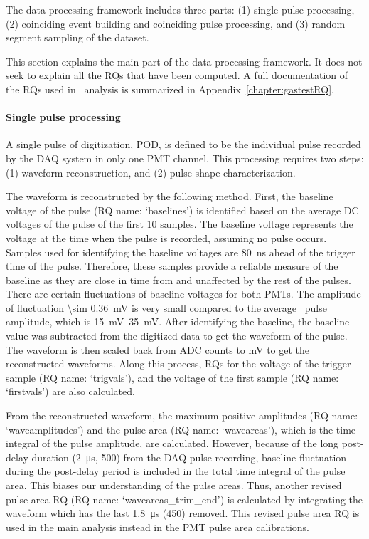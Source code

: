 The data processing framework includes three parts: (1) single pulse processing, (2) coinciding event building and coinciding pulse processing, and (3) random segment sampling of the dataset.

This section explains the main part of the data processing framework. It does not seek to explain all the RQs that have been computed. A full documentation of the RQs used in \gtest\ analysis is summarized in Appendix~\ref{chapter:gastestRQ}.

\paragraph{Single pulse processing} A single pulse of digitization, POD, is defined to be the individual pulse recorded by the DAQ system in only one PMT channel. This processing requires two steps: (1) waveform reconstruction, and (2) pulse shape characterization. 

The waveform is reconstructed by the following method. First, the baseline voltage of the pulse (RQ name: `baselines') is identified based on the average DC voltages of the pulse of the first 10 samples. The baseline voltage represents the voltage at the time when the pulse is recorded, assuming no pulse occurs. Samples used for identifying the baseline voltages are \SI{80}{\ns} ahead of the trigger time of the pulse. Therefore, these samples provide a reliable measure of the baseline as they are close in time from and unaffected by the rest of the pulses. %
There are certain fluctuations of baseline voltages for both PMTs. The amplitude of fluctuation \SI{\sim 0.36}{\mV} is very small compared to the average \sphe\ pulse amplitude, which is \SIrange{15}{35}{\mV}. After identifying the baseline, the baseline value was subtracted from the digitized data to get the waveform of the pulse. The waveform is then scaled back from ADC counts to \si{\mV} to get the reconstructed waveforms. Along this process, RQs for the voltage of the trigger sample (RQ name: `trigvals'), and the voltage of the first sample (RQ name: `firstvals') are also calculated.

From the reconstructed waveform, the maximum positive amplitudes (RQ name: `waveamplitudes') and the pulse area (RQ name: `waveareas'), which is the time integral of the pulse amplitude, are calculated. However, because of the long post-delay duration (\SI{2}{\us}, \SI{500}{\sample}) from the DAQ pulse recording, baseline fluctuation during the post-delay period is included in the total time integral of the pulse area. This biases our understanding of the pulse areas. Thus, another revised pulse area RQ (RQ name: `waveareas\_trim\_end') is calculated by integrating the waveform which has the last \SI{1.8}{\us} (\SI{450}{\sample}) removed. This revised pulse area RQ is used in the main analysis instead in the PMT pulse area calibrations. 

